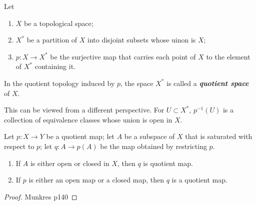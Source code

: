 \begin{mydefinition}
Let
\begin{enumerate}[label={(\alph*)}]
\item $X$ be a topological space;
\item $X^*$ be a partition of $X$ into disjoint subsets whose uinon is $X$;
\item $p:X\to X^*$ be the surjective map that carries each point of $X$ to the element of $X^*$ containing it.
\end{enumerate}
In the quotient topology induced by $p$, the space $X^*$ is called a \textbf{\emph{quotient space}} of $X$.
\end{mydefinition}
This can be viewed from a different perspective. For $U\subset X^*$, $p^{-1}(U)$ is a collection of equivalence classes whose union is open in $X$.

\begin{mytheorem}
Let $p:X\to Y$ be a quotient map; let $A$ be a subspace of $X$ that is saturated with respect to $p$; let $q:A\to p(A)$ be the map obtained by restricting $p$.
\begin{enumerate}[label={(\alph*)}]
\item If $A$ is either open or closed in $X$, then $q$ is quotient map.
\item If $p$ is either an open map or a closed map, then $q$ is a quotient map. 
\end{enumerate}
\end{mytheorem}
\begin{proof}
Munkres p140
\end{proof}
